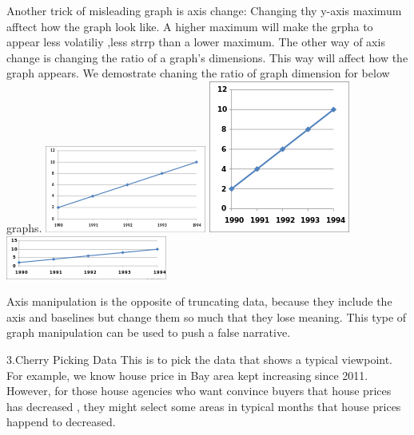 \documentclass[]{book}
\theoremstyle{definition}
\theoremstyle{definition}
\theoremstyle{definition}
\theoremstyle{remark}
\begin{document}
Another trick of misleading graph is axis change: Changing thy y-axis
maximum afftect how the graph look like. A higher maximum will make the
grpha to appear less volatiliy ,less strrp than a lower maximum. The
other way of axis change is changing the ratio of a graph's dimensions.
This way will affect how the graph appears. We demostrate chaning the
ratio of graph dimension for below graphs.
\includegraphics{images/Line_graph1.svg.png}
\includegraphics{images/175px-Line_graph1-3.svg.png}
\includegraphics{images/200px-Line_graph1-4.svg.png}

Axis manipulation is the opposite of truncating data, because they
include the axis and baselines but change them so much that they lose
meaning. This type of graph manipulation can be used to push a false
narrative.

3.Cherry Picking Data This is to pick the data that shows a typical
viewpoint. For example, we know house price in Bay area kept increasing
since 2011. However, for those house agencies who want convince buyers
that house prices has decreased , they might select some areas in
typical months that house prices happend to decreased.
\end{document}
